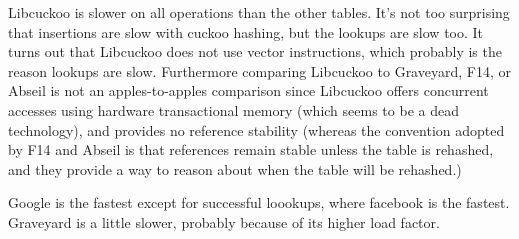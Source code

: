 \documentclass[10pt]{article}
\theoremstyle{remark}
\theoremstyle{remark}
\begin{document}
Libcuckoo is slower on all operations than the other tables.  It's not
too surprising that insertions are slow with cuckoo hashing, but the
lookups are slow too.  It turns out that Libcuckoo does not use vector
instructions, which probably is the reason lookups are slow.
Furthermore comparing Libcuckoo to Graveyard, F14, or Abseil is not an
apples-to-apples comparison since Libcuckoo offers concurrent accesses
using hardware transactional memory (which seems to be a dead
technology), and provides no reference stability (whereas the
convention adopted by F14 and Abseil is that references remain stable
unless the table is rehashed, and they provide a way to reason about
when the table will be rehashed.)

Google is the fastest except for successful loookups, where facebook
is the fastest.  Graveyard is a little slower, probably because of its
higher load factor.  

\end{document}

